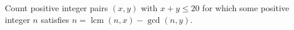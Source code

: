 Count positive integer pairs $(x,y)$ with $x+y\le20$ for which some positive integer $n$ satisfies $n=\operatorname{lcm}(n,x)-\gcd(n,y)$.
